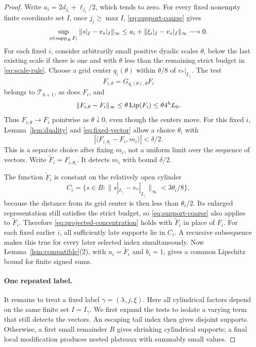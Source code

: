 \begin{proof}
Write \(a_i=2d_{j_i}+\ell_{j_i}/2\), which tends to zero.
For every fixed nonempty finite coordinate set \(I\), once
\(j_i\geq\max I\), \eqref{eq:support-coarse} gives
\begin{equation}
 \sup_{s\in\operatorname{supp}_B F_i}\|s|_I-v_*|_I\|_\infty
 \leq a_i+\|\xi_i|_I-v_*|_I\|_\infty\longrightarrow0.       \label{eq:projected-concentration}
\end{equation}
For each fixed \(i\), consider arbitrarily small positive dyadic
scales \(\theta\), below the last existing scale if there is one and
with \(\theta\) less than the remaining strict budget in
\eqref{eq:scale-rule}. Choose a grid center \(q_i(\theta)\) within
\(\theta/8\) of \(v_*|_{I_{\gamma_i}}\). The test
\[
                 F_{i,\theta}=G_{q_i(\theta),\theta}F_i
\]
belongs to \(\mathcal T_{h+1}\), as does \(F_i\), and
\[
       \|F_{i,\theta}-F_i\|_\infty
                    \leq\theta\operatorname{Lip}(F_i)\leq\theta4^hL_0.
\]
Thus \(F_{i,\theta}\to F_i\) pointwise as \(\theta\downarrow0\),
even though the centers move. For this fixed \(i\),
Lemma~\ref{lem:duality} and \eqref{eq:fixed-vector} allow a choice
\(\theta_i\) with
\[
 |\langle F_{i,\theta_i}-F_i,m_i\rangle|<\delta/2.
\]
This is a separate choice after fixing \(m_i\), not a uniform limit
over the sequence of vectors. Write \(\widetilde F_i=F_{i,\theta_i}\).
It detects \(m_i\) with bound \(\delta/2\).

The function \(\widetilde F_i\) is constant on the relatively open
cylinder
\begin{equation}
 C_i=\{s\in B:\|s|_{I_{\gamma_i}}-v_*|_{I_{\gamma_i}}\|_\infty
                                      <3\theta_i/8\},        \label{eq:plateau-cylinder}
\end{equation}
because the distance from its grid center is then less than
\(\theta_i/2\). Its enlarged representation still satisfies the
strict budget, so \eqref{eq:support-coarse} also applies to
\(\widetilde F_i\). Therefore \eqref{eq:projected-concentration} holds with \(\widetilde F_i\)
in place of \(F_i\). For each fixed earlier \(i\), all sufficiently
late supports lie in \(C_i\). A recursive subsequence makes this
true for every later selected index simultaneously. Now
Lemma~\ref{lem:compatible}(2), with \(u_i=\widetilde F_i\) and
\(b_i=1\), gives a common Lipschitz bound for finite signed sums.

\paragraph{One repeated label.}
It remains to treat a fixed label \(\gamma=(\lambda,j,\xi)\).
Here all cylindrical factors depend on the same finite set
\(I=I_\gamma\). We first expand the tests to isolate a varying term
that still detects the vectors. An escaping tail index then gives
disjoint supports. Otherwise, a first small remainder \(R\) gives
shrinking cylindrical supports; a final local modification produces
nested plateaux with summably small values.


\end{proof}
